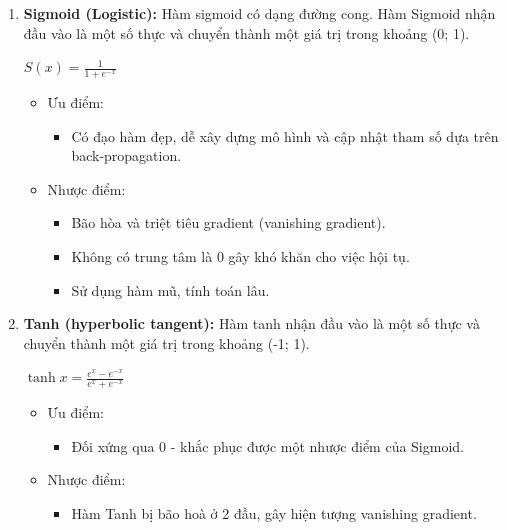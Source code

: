 \begin{enumerate}
    \item \textbf{Sigmoid (Logistic):} Hàm sigmoid có dạng đường cong. Hàm Sigmoid nhận đầu vào là một số thực và chuyển thành một giá trị trong khoảng (0; 1).
    \begin{center}
        \large $S(x)=\frac{1}{1+e^{-x}}$
        \end{center}
    \begin{itemize}
        \item Ưu điểm: 
        \begin{itemize}
            \item Có đạo hàm đẹp, dễ xây dựng mô hình và cập nhật tham số dựa trên back-propagation.
        \end{itemize}
        \item Nhược điểm: 
        \begin{itemize}
            \item Bão hòa và triệt tiêu gradient (vanishing gradient).
            \item Không có trung tâm là 0 gây khó khăn cho việc hội tụ.
            \item Sử dụng hàm mũ, tính toán lâu.
        \end{itemize}
    \end{itemize}
    
    \item \textbf{Tanh (hyperbolic tangent):} Hàm tanh nhận đầu vào là một số thực và chuyển thành một giá trị trong khoảng (-1; 1).
    \begin{center}
        \large $\tanh x = \frac{e^{x}-e^{-x}}{e^{x}+e^{-x}}$
        \end{center}
    \begin{itemize}
        \item Ưu điểm: 
        \begin{itemize}
            \item Đối xứng qua 0 - khắc phục được một nhược điểm của Sigmoid.
        \end{itemize}
        \item Nhược điểm: 
        \begin{itemize}
            \item Hàm Tanh bị bão hoà ở 2 đầu, gây hiện tượng vanishing gradient.
        \end{itemize}
    \end{itemize}
    

\end{enumerate}
